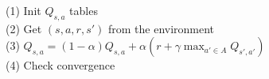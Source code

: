 \documentclass{article}
\begin{document}
\begin{flushleft}
(1) Init $Q_{s, a}$ tables \\
(2) Get $(s, a, r, s')$ from the environment \\
(3) $Q_{s, a} = (1 - \alpha) Q_{s, a} + \alpha (r + \gamma \max_{a' \in A} Q_{s', a'})$ \\
(4) Check convergence
\end{flushleft}
\end{document}
